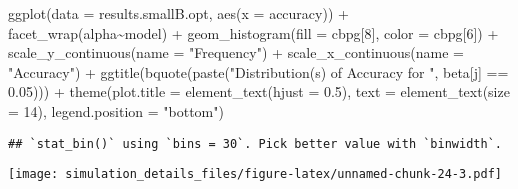 \documentclass[
]{article}
\newenvironment{Shaded}{\begin{snugshade}}{\end{snugshade}}
\newcommand{\AttributeTok}[1]{\textcolor[rgb]{0.77,0.63,0.00}{#1}}
\newcommand{\DecValTok}[1]{\textcolor[rgb]{0.00,0.00,0.81}{#1}}
\newcommand{\FloatTok}[1]{\textcolor[rgb]{0.00,0.00,0.81}{#1}}
\newcommand{\FunctionTok}[1]{\textcolor[rgb]{0.00,0.00,0.00}{#1}}
\newcommand{\NormalTok}[1]{#1}
\newcommand{\SpecialCharTok}[1]{\textcolor[rgb]{0.00,0.00,0.00}{#1}}
\newcommand{\StringTok}[1]{\textcolor[rgb]{0.31,0.60,0.02}{#1}}
\begin{document}
\begin{Shaded}
\begin{Highlighting}[]
\FunctionTok{ggplot}\NormalTok{(}\AttributeTok{data =}\NormalTok{ results.smallB.opt,}
       \FunctionTok{aes}\NormalTok{(}\AttributeTok{x =}\NormalTok{ accuracy)) }\SpecialCharTok{+}
  \FunctionTok{facet\_wrap}\NormalTok{(alpha}\SpecialCharTok{\textasciitilde{}}\NormalTok{model) }\SpecialCharTok{+}
  \FunctionTok{geom\_histogram}\NormalTok{(}\AttributeTok{fill =}\NormalTok{ cbpg[}\DecValTok{8}\NormalTok{], }\AttributeTok{color =}\NormalTok{ cbpg[}\DecValTok{6}\NormalTok{]) }\SpecialCharTok{+}
  \FunctionTok{scale\_y\_continuous}\NormalTok{(}\AttributeTok{name =} \StringTok{"Frequency"}\NormalTok{) }\SpecialCharTok{+}
  \FunctionTok{scale\_x\_continuous}\NormalTok{(}\AttributeTok{name =} \StringTok{"Accuracy"}\NormalTok{) }\SpecialCharTok{+}
  \FunctionTok{ggtitle}\NormalTok{(}\FunctionTok{bquote}\NormalTok{(}\FunctionTok{paste}\NormalTok{(}\StringTok{"Distribution(s) of Accuracy for "}\NormalTok{, beta[j] }\SpecialCharTok{==} \FloatTok{0.05}\NormalTok{))) }\SpecialCharTok{+}
  \FunctionTok{theme}\NormalTok{(}\AttributeTok{plot.title =} \FunctionTok{element\_text}\NormalTok{(}\AttributeTok{hjust =} \FloatTok{0.5}\NormalTok{), }
        \AttributeTok{text =} \FunctionTok{element\_text}\NormalTok{(}\AttributeTok{size =} \DecValTok{14}\NormalTok{),}
        \AttributeTok{legend.position =} \StringTok{"bottom"}\NormalTok{)}
\end{Highlighting}
\end{Shaded}

\begin{verbatim}
## `stat_bin()` using `bins = 30`. Pick better value with `binwidth`.
\end{verbatim}

\texttt{[image: simulation\_details\_files/figure-latex/unnamed-chunk-24-3.pdf]}
\end{document}
